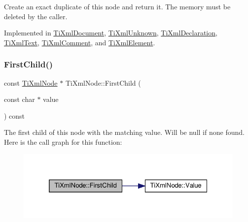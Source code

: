 Create an exact duplicate of this node and return it. The memory must be deleted by the caller. 

Implemented in \hyperlink{classTiXmlDocument_a46a4dda6c56eb106d46d4046ae1e5353}{Ti\+Xml\+Document}, \hyperlink{classTiXmlUnknown_a3dea7689de5b1931fd6657992948fde0}{Ti\+Xml\+Unknown}, \hyperlink{classTiXmlDeclaration_a35dc1455f69b79e81cae28e186944610}{Ti\+Xml\+Declaration}, \hyperlink{classTiXmlText_a98a20d7a4f1c1478e25e34921be24bfe}{Ti\+Xml\+Text}, \hyperlink{classTiXmlComment_a1f9f06e2ed3f77875093436193b16c16}{Ti\+Xml\+Comment}, and \hyperlink{classTiXmlElement_a810ea8fa40844c01334e5af2a26794cb}{Ti\+Xml\+Element}.

\mbox{\label{classTiXmlNode_ae98c367f664890c4b5a5183481ec128a}} 
\subsubsection{\texorpdfstring{First\+Child()}{FirstChild()}}
{\footnotesize\ttfamily const \hyperlink{classTiXmlNode}{Ti\+Xml\+Node} $\ast$ Ti\+Xml\+Node\+::\+First\+Child (\begin{DoxyParamCaption}\item[{const char $\ast$}]{value }\end{DoxyParamCaption}) const}

The first child of this node with the matching \textquotesingle{}value\textquotesingle{}. Will be null if none found. Here is the call graph for this function\+:
\nopagebreak
\begin{figure}[H]
\begin{center}
\leavevmode
\includegraphics[width=325pt]{classTiXmlNode_ae98c367f664890c4b5a5183481ec128a_cgraph}
\end{center}
\end{figure}
\mbox{\label{classTiXmlNode_adcb070acefcbaedaa0673d82e530538b}} 
